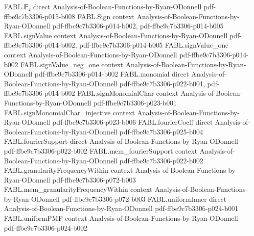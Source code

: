 \begin{theorem}
\label{FABL.component_acceptanceProbability_ge_of_uniformMixture_ge}
\leanok
{}
\proofstep
  {FABL.𝔽₂}
  {direct}
  {Analysis-of-Boolean-Functions-by-Ryan-ODonnell}
  {pdf-ffbe9c7b3306-p015-b008}
\proofstep
  {FABL.Sign}
  {context}
  {Analysis-of-Boolean-Functions-by-Ryan-ODonnell}
  {pdf-ffbe9c7b3306-p014-b002,
    pdf-ffbe9c7b3306-p014-b005}
\proofstep
  {FABL.signValue}
  {context}
  {Analysis-of-Boolean-Functions-by-Ryan-ODonnell}
  {pdf-ffbe9c7b3306-p014-b002,
    pdf-ffbe9c7b3306-p014-b005}
\proofstep
  {FABL.signValue_one}
  {context}
  {Analysis-of-Boolean-Functions-by-Ryan-ODonnell}
  {pdf-ffbe9c7b3306-p014-b002}
\proofstep
  {FABL.signValue_neg_one}
  {context}
  {Analysis-of-Boolean-Functions-by-Ryan-ODonnell}
  {pdf-ffbe9c7b3306-p014-b002}
\proofstep
  {FABL.monomial}
  {direct}
  {Analysis-of-Boolean-Functions-by-Ryan-ODonnell}
  {pdf-ffbe9c7b3306-p022-b001,
    pdf-ffbe9c7b3306-p014-b002}
\proofstep
  {FABL.signMonomialChar}
  {context}
  {Analysis-of-Boolean-Functions-by-Ryan-ODonnell}
  {pdf-ffbe9c7b3306-p023-b001}
\proofstep
  {FABL.signMonomialChar_injective}
  {context}
  {Analysis-of-Boolean-Functions-by-Ryan-ODonnell}
  {pdf-ffbe9c7b3306-p023-b006}
\proofstep
  {FABL.fourierCoeff}
  {direct}
  {Analysis-of-Boolean-Functions-by-Ryan-ODonnell}
  {pdf-ffbe9c7b3306-p025-b004}
\proofstep
  {FABL.fourierSupport}
  {direct}
  {Analysis-of-Boolean-Functions-by-Ryan-ODonnell}
  {pdf-ffbe9c7b3306-p022-b002}
\proofstep
  {FABL.mem_fourierSupport}
  {context}
  {Analysis-of-Boolean-Functions-by-Ryan-ODonnell}
  {pdf-ffbe9c7b3306-p022-b002}
\proofstep
  {FABL.granularityFrequencyWithin}
  {context}
  {Analysis-of-Boolean-Functions-by-Ryan-ODonnell}
  {pdf-ffbe9c7b3306-p072-b003}
\proofstep
  {FABL.mem_granularityFrequencyWithin}
  {context}
  {Analysis-of-Boolean-Functions-by-Ryan-ODonnell}
  {pdf-ffbe9c7b3306-p072-b003}
\proofstep
  {FABL.uniformInner}
  {direct}
  {Analysis-of-Boolean-Functions-by-Ryan-ODonnell}
  {pdf-ffbe9c7b3306-p024-b001}
\proofstep
  {FABL.uniformPMF}
  {context}
  {Analysis-of-Boolean-Functions-by-Ryan-ODonnell}
  {pdf-ffbe9c7b3306-p024-b002}

\end{theorem}
